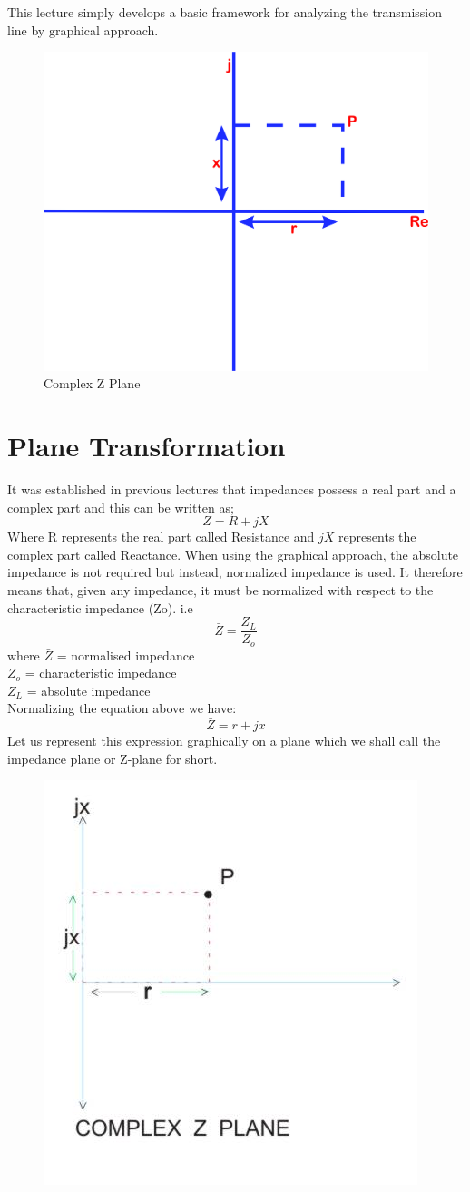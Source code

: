 This lecture simply develops a basic framework for analyzing the transmission line by graphical approach.
\begin{figure}[h]
\centering
\includegraphics[width=0.5\linewidth]{./graphics/mjhdj}
\caption{Complex Z Plane}
\label{fig:mjhdj}
\end{figure}

\section{Plane Transformation}
It was established in previous lectures that impedances possess a real part and a complex part and this can be written as;
\begin{equation*}
Z= R+jX
\end{equation*}
Where R  represents the real part called Resistance and $jX$ represents the complex part called Reactance. When using the graphical approach, the absolute impedance is not required but instead, normalized impedance is used. It therefore means that, given any impedance, it must be normalized with respect to the characteristic impedance (Zo). i.e
\begin{equation*}
\bar{Z}=\frac{Z_L}{Z_o}
\end{equation*}
where $\bar{Z}$ = normalised impedance\\
$Z_o$ = characteristic impedance\\
$Z_L$   =  absolute  impedance \\
Normalizing the equation above we have: 
\begin{equation*}
\bar{Z}= r + jx
\end{equation*}
Let us represent this expression graphically on a plane which we shall call the impedance plane or Z-plane for short.
\begin{figure}[h]
\center\includegraphics[width=0.5\linewidth]{./graphics/TransLine2}
\label{fig:transline2}
\end{figure}

